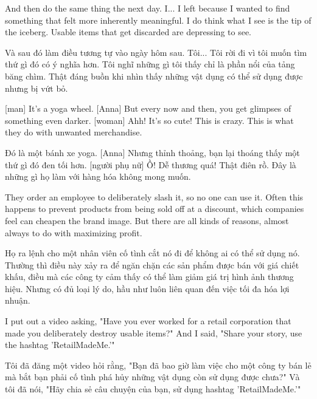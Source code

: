 \documentclass[a4paper]{article}
\begin{document}
	And then do the same thing the next day.
	I... I left because I wanted to find something that felt more inherently meaningful.
	I do think what I see is the tip of the iceberg.
	Usable items that get discarded are depressing to see.
	
	\begin{vietnamese-v2}
		Và sau đó làm điều tương tự vào ngày hôm sau.
		Tôi... Tôi rời đi vì tôi muốn tìm thứ gì đó có ý nghĩa hơn.
		Tôi nghĩ những gì tôi thấy chỉ là phần nổi của tảng băng chìm.
		Thật đáng buồn khi nhìn thấy những vật dụng có thể sử dụng được nhưng bị vứt bỏ.
	\end{vietnamese-v2}
	
	[man] It's a yoga wheel.
	[Anna] But every now and then, you get glimpses of something even darker.
	[woman] Ahh! It's so cute!
	This is crazy. This is what they do with unwanted merchandise.
	
	\begin{vietnamese-v2}
		 Đó là một bánh xe yoga.
		[Anna] Nhưng thỉnh thoảng, bạn lại thoáng thấy một thứ gì đó đen tối hơn.
		[người phụ nữ] Ồ! Dễ thương quá!
		Thật điên rồ. Đây là những gì họ làm với hàng hóa không mong muốn.
	\end{vietnamese-v2}
	
	They order an employee to deliberately slash it, so no one can use it.
	Often this happens to prevent products from being sold off at a discount, which companies feel can cheapen the brand image.
	But there are all kinds of reasons, almost always to do with maximizing profit.
	
	\begin{vietnamese-v2}
		Họ ra lệnh cho một nhân viên cố tình cắt nó đi để không ai có thể sử dụng nó.
		Thường thì điều này xảy ra để ngăn chặn các sản phẩm được bán với giá chiết khấu, điều mà các công ty cảm thấy có thể làm giảm giá trị hình ảnh thương hiệu.
		Nhưng có đủ loại lý do, hầu như luôn liên quan đến việc tối đa hóa lợi nhuận.
	\end{vietnamese-v2}
	
	I put out a video asking, "Have you ever worked for a retail corporation that made you deliberately destroy usable items?"
	And I said, "Share your story, use the hashtag 'RetailMadeMe.'"
	
	\begin{vietnamese-v2}
		Tôi đã đăng một video hỏi rằng, "Bạn đã bao giờ làm việc cho một công ty bán lẻ mà bắt bạn phải cố tình phá hủy những vật dụng còn sử dụng được chưa?"
		Và tôi đã nói, "Hãy chia sẻ câu chuyện của bạn, sử dụng hashtag 'RetailMadeMe.'"
	\end{vietnamese-v2}
	
\end{document}
